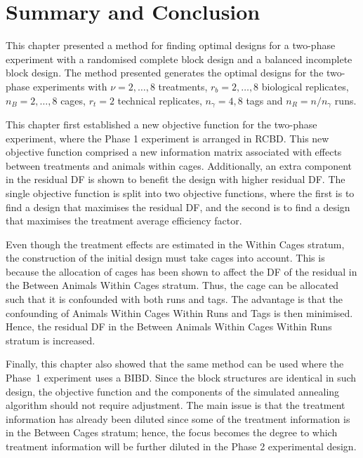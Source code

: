 \section{Summary and Conclusion}
\label{sec:conclusionChap4}
This chapter presented a method for finding optimal designs for a two-phase experiment with a randomised complete block design and a balanced incomplete block design. The method presented generates the optimal designs for the two-phase experiments with $\nu = 2,\dots,8$ treatments, $r_b = 2,\dots,8$ biological replicates, $n_B = 2,\dots,8$ cages, $r_t = 2$ technical replicates, $n_\gamma = 4,8$ tags and $n_R = n/n_\gamma$ runs. 

This chapter first established a new objective function for the two-phase experiment, where the Phase 1 experiment is arranged in RCBD. This new objective function comprised a new information matrix associated with effects between treatments and animals within cages. Additionally, an extra component in the residual DF is shown to benefit the design with higher residual DF. The single objective function is split into two objective functions, where the first is to find a design that maximises the residual DF, and the second is to find a design that maximises the treatment average efficiency factor.    

Even though the treatment effects are estimated in the Within Cages stratum, the construction of the initial design must take cages into account. This is because the allocation of cages has been shown to affect the DF of the residual in the Between Animals Within Cages stratum. Thus, the cage can be allocated such that it is confounded with both runs and tags. The advantage is that the confounding of Animals Within Cages Within Runs and Tags is then minimised. Hence, the residual DF in the Between Animals Within Cages Within Runs stratum is increased. 

Finally, this chapter also showed that the same method can be used where the Phase~1 experiment uses a BIBD. Since the block structures are identical in such design, the objective function and the components of the simulated annealing algorithm should not require adjustment. The main issue is that the treatment information has already been diluted since some of the treatment information is in the Between Cages stratum; hence, the focus becomes the degree to which treatment information will be further diluted in the Phase 2 experimental design.




